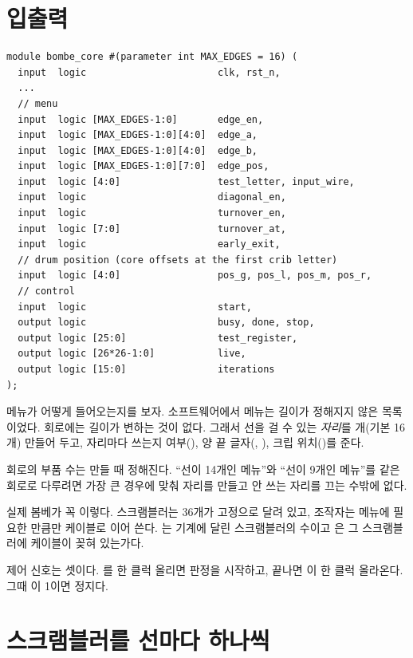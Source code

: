 \section{입출력}

\begin{lstlisting}[language=SV,caption={\code{bombe\_core.sv}의 입출력(로터 순서 입력은 \code{scrambler}와 같아 생략).}]
module bombe_core #(parameter int MAX_EDGES = 16) (
  input  logic                       clk, rst_n,
  ...
  // menu
  input  logic [MAX_EDGES-1:0]       edge_en,
  input  logic [MAX_EDGES-1:0][4:0]  edge_a,
  input  logic [MAX_EDGES-1:0][4:0]  edge_b,
  input  logic [MAX_EDGES-1:0][7:0]  edge_pos,
  input  logic [4:0]                 test_letter, input_wire,
  input  logic                       diagonal_en,
  input  logic                       turnover_en,
  input  logic [7:0]                 turnover_at,
  input  logic                       early_exit,
  // drum position (core offsets at the first crib letter)
  input  logic [4:0]                 pos_g, pos_l, pos_m, pos_r,
  // control
  input  logic                       start,
  output logic                       busy, done, stop,
  output logic [25:0]                test_register,
  output logic [26*26-1:0]           live,
  output logic [15:0]                iterations
);
\end{lstlisting}

메뉴가 어떻게 들어오는지를 보자. 소프트웨어에서 메뉴는 길이가 정해지지 않은 목록이었다. 회로에는 길이가
변하는 것이 없다. 그래서 선을 걸 수 있는 \emph{자리}를 개(기본 16개) 만들어 두고, 자리마다
쓰는지 여부(), 양 끝 글자(, ), 크립 위치()를 준다.

\Why 회로의 부품 수는 만들 때 정해진다. ``선이 14개인 메뉴''와 ``선이 9개인 메뉴''를 같은 회로로 다루려면
가장 큰 경우에 맞춰 자리를 만들고 안 쓰는 자리를 끄는 수밖에 없다.

\Ours 실제 봄베가 꼭 이렇다. 스크램블러는 36개가 고정으로 달려 있고, 조작자는 메뉴에 필요한 만큼만
케이블로 이어 쓴다. 는 기계에 달린 스크램블러의 수이고 은 그 스크램블러에
케이블이 꽂혀 있는가다.

제어 신호는 셋이다. 를 한 클럭 올리면 판정을 시작하고, 끝나면 이 한 클럭 올라온다.
그때 이 1이면 정지다.

\section{스크램블러를 선마다 하나씩}

